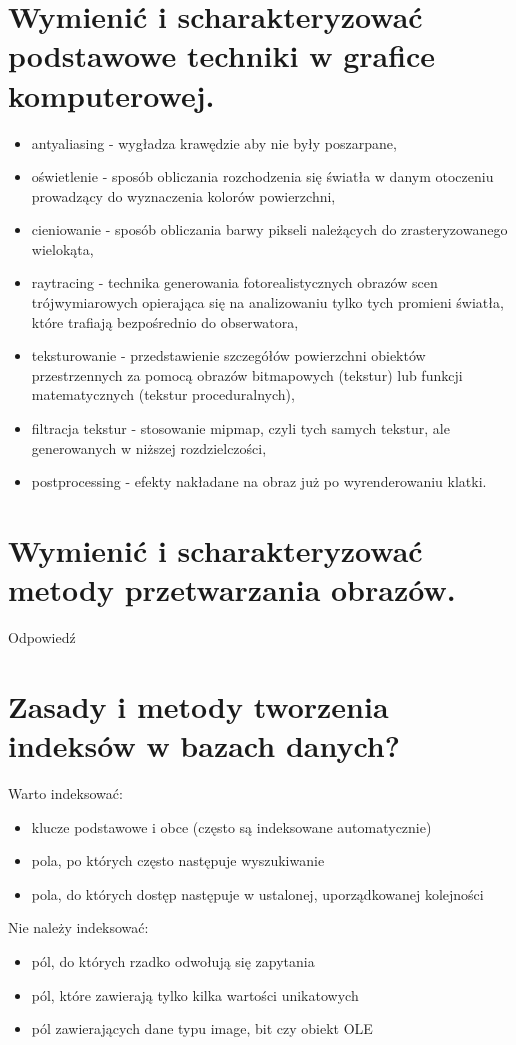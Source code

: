 \documentclass[12pt,a4paper]{article}
\begin{document}
	\section{Wymienić i scharakteryzować podstawowe techniki w grafice komputerowej.}
	\begin{itemize}
		\item antyaliasing - wygładza krawędzie aby nie były poszarpane,
		\item oświetlenie - sposób obliczania rozchodzenia się światła w danym otoczeniu prowadzący do wyznaczenia kolorów powierzchni, 
		\item cieniowanie - sposób obliczania barwy pikseli należących do zrasteryzowanego wielokąta,
		\item raytracing - technika generowania fotorealistycznych obrazów scen trójwymiarowych opierająca się na analizowaniu tylko tych promieni światła, które trafiają bezpośrednio do obserwatora, 
		\item teksturowanie - przedstawienie szczegółów powierzchni obiektów przestrzennych za pomocą obrazów bitmapowych (tekstur) lub funkcji matematycznych (tekstur proceduralnych),
		\item filtracja tekstur - stosowanie mipmap, czyli tych samych tekstur, ale generowanych w niższej rozdzielczości,
		\item postprocessing - efekty nakładane na obraz już po wyrenderowaniu klatki.
	\end{itemize}

	\section{Wymienić i scharakteryzować metody przetwarzania obrazów.}
	Odpowiedź

	\section{Zasady i metody tworzenia indeksów w bazach danych?}
	Warto indeksować:
	\begin{itemize}
		\item klucze podstawowe i obce (często są indeksowane automatycznie)
		\item pola, po których często następuje wyszukiwanie
		\item pola, do których dostęp następuje w ustalonej, uporządkowanej kolejności
	\end{itemize}
	Nie należy indeksować:
	\begin{itemize}
		\item pól, do których rzadko odwołują się zapytania
		\item pól, które zawierają tylko kilka wartości unikatowych
		\item pól zawierających dane typu image, bit czy obiekt OLE 
	\end{itemize}
\end{document}
